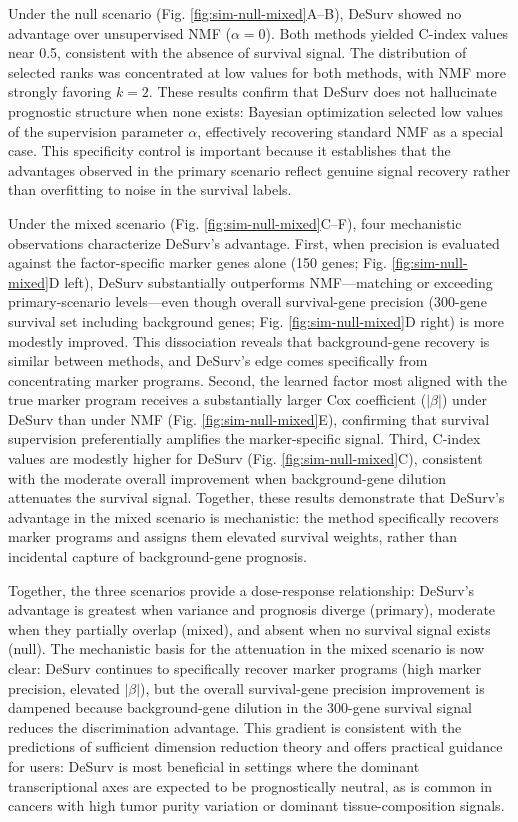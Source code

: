 \documentclass[
]{article}
\begin{document}
Under the null scenario (Fig. \ref{fig:sim-null-mixed}A--B), DeSurv
showed no advantage over unsupervised NMF (\(\alpha = 0\)). Both methods
yielded C-index values near 0.5, consistent with the absence of survival
signal. The distribution of selected ranks was concentrated at low
values for both methods, with NMF more strongly favoring \(k = 2\).
These results confirm that DeSurv does not hallucinate prognostic
structure when none exists: Bayesian optimization selected low values of
the supervision parameter \(\alpha\), effectively recovering standard
NMF as a special case. This specificity control is important because it
establishes that the advantages observed in the primary scenario reflect
genuine signal recovery rather than overfitting to noise in the survival
labels.

Under the mixed scenario (Fig. \ref{fig:sim-null-mixed}C--F), four
mechanistic observations characterize DeSurv's advantage. First, when
precision is evaluated against the factor-specific marker genes alone
(150 genes; Fig. \ref{fig:sim-null-mixed}D left), DeSurv substantially
outperforms NMF---matching or exceeding primary-scenario levels---even
though overall survival-gene precision (300-gene survival set including
background genes; Fig. \ref{fig:sim-null-mixed}D right) is more modestly
improved. This dissociation reveals that background-gene recovery is
similar between methods, and DeSurv's edge comes specifically from
concentrating marker programs. Second, the learned factor most aligned
with the true marker program receives a substantially larger Cox
coefficient (\(|\beta|\)) under DeSurv than under NMF (Fig.
\ref{fig:sim-null-mixed}E), confirming that survival supervision
preferentially amplifies the marker-specific signal. Third, C-index
values are modestly higher for DeSurv (Fig. \ref{fig:sim-null-mixed}C),
consistent with the moderate overall improvement when background-gene
dilution attenuates the survival signal. Together, these results
demonstrate that DeSurv's advantage in the mixed scenario is
mechanistic: the method specifically recovers marker programs and
assigns them elevated survival weights, rather than incidental capture
of background-gene prognosis.

Together, the three scenarios provide a dose-response relationship:
DeSurv's advantage is greatest when variance and prognosis diverge
(primary), moderate when they partially overlap (mixed), and absent when
no survival signal exists (null). The mechanistic basis for the
attenuation in the mixed scenario is now clear: DeSurv continues to
specifically recover marker programs (high marker precision, elevated
\(|\beta|\)), but the overall survival-gene precision improvement is
dampened because background-gene dilution in the 300-gene survival
signal reduces the discrimination advantage. This gradient is consistent
with the predictions of sufficient dimension reduction theory and offers
practical guidance for users: DeSurv is most beneficial in settings
where the dominant transcriptional axes are expected to be
prognostically neutral, as is common in cancers with high tumor purity
variation or dominant tissue-composition signals.
\end{document}
